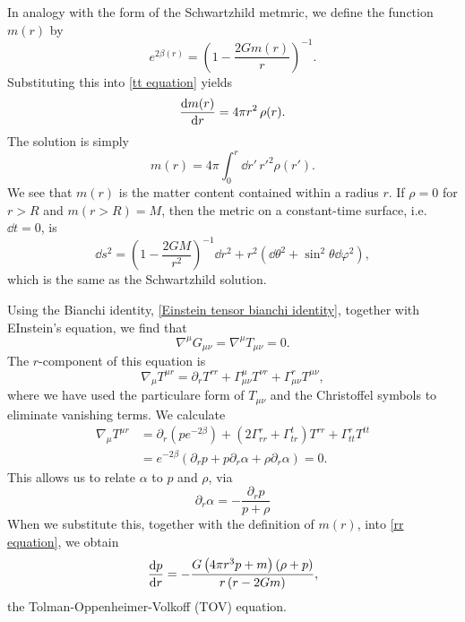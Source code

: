 %
In analogy with the form of the Schwartzhild metmric, we define the function $m(r)$ by
\begin{equation}
    e^{2 \beta(r)} = \left(1 - \frac{2 G m(r)}{r} \right)^{-1}. 
\end{equation}
Substituting this into \autoref{tt equation} yields 
\begin{equation}
    \diff{m(r)}{r} = 4 \pi r^2 \, \rho(r).
\end{equation}
The solution is simply
\begin{equation}
    m(r) = 4 \pi \int_0^r \dd r' \, {r'}^2 \rho(r').
\end{equation}
We see that $m(r)$ is the matter content contained within a radius $r$.
If $\rho = 0$ for $r > R$ and $m(r>R) = M$, then the metric on a constant-time surface, i.e. $\dd t = 0$, is
%
\begin{equation}
    \dd s^2 
    = 
    \left( 1 - \frac{2 G M}{r^2} \right)^{-1} \dd r^2 
    + r^2 (\dd \theta^2 + \sin^2 \theta \dd\varphi^2),
\end{equation} 
%
which is the same as the Schwartzhild solution.

Using the Bianchi identity, \autoref{Einstein tensor bianchi identity}, together with EInstein's equation, we find that
%
\begin{equation}
    \nabla^\mu G_{\mu \nu} = \nabla^\mu T_{\mu \nu} = 0.
\end{equation}
%
The $r$-component of this equation is
%
\begin{equation}
    \nabla_\mu T^{\mu r} 
    =
    \partial_r T^{rr} 
    + \Gamma^\mu_{\mu \nu} T^{\nu r} 
    + \Gamma^r_{\mu \nu} T^{\mu \nu},
\end{equation}
%
where we have used the particulare form of $T_{\mu \nu}$ and the Christoffel symbols to eliminate vanishing terms.
We calculate
%
\begin{align*}
    \nabla_\mu T^{\mu r} 
    & = 
    \partial_r \left(p e^{-2\beta}\right)
    + (2 \Gamma^r_{rr} + \Gamma^t_{tr}) T^{rr} 
    + \Gamma^r_{tt}T^{tt} \\ 
    &=   e^{-2\beta} \left( \partial_r p + p \partial_r \alpha + \rho \partial_r \alpha \right) = 0.
\end{align*} 
%
This allows us to relate $\alpha$ to $p$ and $\rho$, via
\begin{equation}
    \partial_r \alpha = - \frac{\partial_r p}{p + \rho}
\end{equation}
When we substitute this, together with the definition of $m(r)$, into \autoref{rr equation}, we obtain
\begin{equation}
    \diff{p}{r}
    =
    -
    \frac{
        G \left(4 \pi r^{3} p + m \right) \left(\rho + p \right)
        }
        {r \left(r- 2 G m\right)},
\end{equation}
the Tolman-Oppenheimer-Volkoff (TOV) equation.
